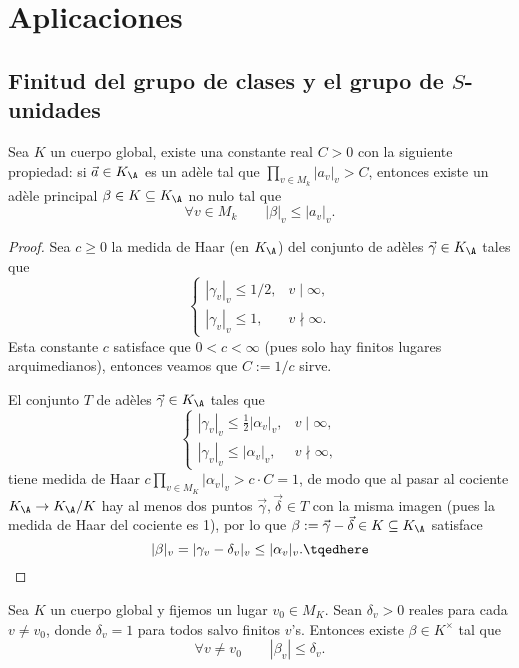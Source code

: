 \documentclass[teoria-numeros.tex]{subfiles}
\begin{document}
\section{Aplicaciones}
\subsection{Finitud del grupo de clases y el grupo de $S$-unidades}
\begin{lem}\label{thm:adelic_constant}
	Sea $K$ un cuerpo global, existe una constante real $C > 0$ con la siguiente propiedad:
	si $\vec a \in K_\A$ es un adèle tal que $\prod_{v\in M_k} |a_v|_v > C$,
	entonces existe un adèle principal $\beta \in K \subseteq K_\A$ no nulo tal que
	\[
		\forall v\in M_k \qquad |\beta|_v \le |a_v|_v.
	\]
\end{lem}
\begin{proof}
	Sea $c \ge 0$ la medida de Haar (en $K_\A$) del conjunto de adèles $\vec\gamma \in K_\A$ tales que
	\[
		\begin{cases}
			|\gamma_v|_v \le 1/2, & v \mid \infty, \\
			|\gamma_v|_v \le 1, & v \nmid \infty.
		\end{cases}
	\]
	Esta constante $c$ satisface que $0 < c < \infty$ (pues solo hay finitos lugares arquimedianos), entonces veamos que $C := 1/c$ sirve.

	El conjunto $T$ de adèles $\vec\gamma \in K_\A$ tales que
	\[
		\begin{cases}
			|\gamma_v|_v \le \tfrac{1}{2}|\alpha_v|_v, & v \mid \infty, \\
			|\gamma_v|_v \le |\alpha_v|_v, & v \nmid \infty,
		\end{cases}
	\]
	tiene medida de Haar $c \prod_{v\in M_K} |\alpha_v|_v > c\cdot C = 1$, de modo que al pasar al cociente $K_\A \to K_\A / K$
	hay al menos dos puntos $\vec\gamma, \vec\delta \in T$ con la misma imagen (pues la medida de Haar del cociente es 1), por lo que
	$\beta := \vec\gamma - \vec\delta \in K \subseteq K_\A$ satisface
	\begin{equation}
		|\beta|_v = |\gamma_v - \delta_v|_v \le |\alpha_v|_v.
		\tqedhere
	\end{equation}
\end{proof}

\begin{cor}
	Sea $K$ un cuerpo global y fijemos un lugar $v_0 \in M_K$.
	Sean $\delta_v > 0$ reales para cada $v \ne v_0$, donde $\delta_v = 1$ para todos salvo finitos $v$'s.
	Entonces existe $\beta \in K^\times$ tal que
	$$ \forall v\ne v_0 \qquad |\beta_v| \le \delta_v. $$
\end{cor}
\end{document}
